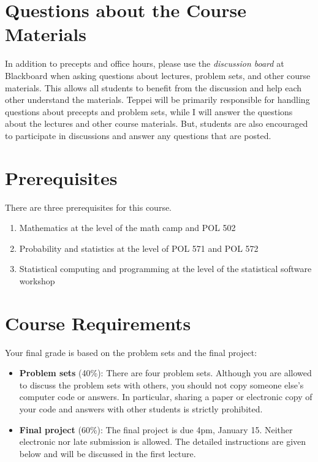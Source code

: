 \documentclass[11pt]{article}
\begin{document}
\section{Questions about the Course Materials}

In addition to precepts and office hours, please use the {\it
  discussion board} at Blackboard when asking questions about
lectures, problem sets, and other course materials.  This allows all
students to benefit from the discussion and help each other understand
the materials.  Teppei will be primarily responsible for handling
questions about precepts and problem sets, while I will answer the
questions about the lectures and other course materials.  But,
students are also encouraged to participate in discussions and answer
any questions that are posted.

\section{Prerequisites}

There are three prerequisites for this course.
\begin{enumerate}
\item Mathematics at the level of the math camp and POL 502
\item Probability and statistics at the level of POL 571 and POL 572
\item Statistical computing and programming at the level of the
  statistical software workshop
\end{enumerate}

\section{Course Requirements}

Your final grade is based on the problem sets and the final project:
\begin{itemize}
\item {\bf Problem sets} (40\%): There are four problem sets.
  Although you are allowed to discuss the problem sets with others,
  you should not copy someone else's computer code or answers.  In
  particular, sharing a paper or electronic copy of your code and
  answers with other students is strictly prohibited.
 

\item {\bf Final project} (60\%): The final project is due 4pm,
  January 15.  Neither electronic nor late submission is allowed.  The
  detailed instructions are given below and will be discussed in the
  first lecture.
\end{itemize} 
\end{document}
